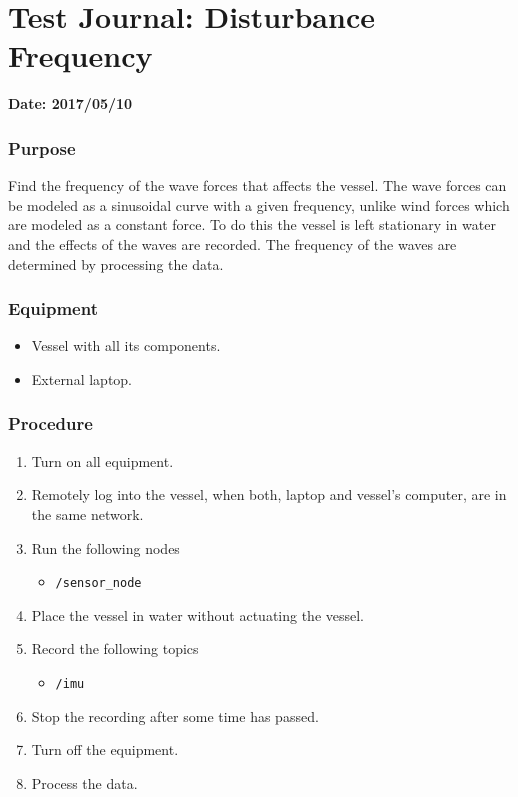 \chapter{Test Journal: Disturbance Frequency} \label{app:Disturbance}

\textbf{Date: 2017/05/10}

\subsection*{Purpose}
Find the frequency of the wave forces that affects the vessel. The wave forces can be modeled as a sinusoidal curve with a given frequency, unlike wind forces which are modeled as a constant force. To do this the vessel is left stationary in water and the effects of the waves are recorded. The frequency of the waves are determined by processing the data.

\subsection*{Equipment}
\begin{itemize}
    \item Vessel with all its components. 
    \item External laptop.
\end{itemize}

\subsection*{Procedure}
\begin{enumerate}
    \item Turn on all equipment.
    \item Remotely log into the vessel, when both, laptop and vessel's computer, are in the same network.
    \item Run the following nodes
    \begin{itemize}
        \item \lstinline[style=cinline]{/sensor_node}
    \end{itemize}
    \item Place the vessel in water without actuating the vessel.
    \item Record the following topics
    \begin{itemize}
        \item \lstinline[style=cinline]{/imu}      
    \end{itemize}
    \item Stop the recording after some time has passed.
    \item Turn off the equipment.
    \item Process the data.
\end{enumerate}


